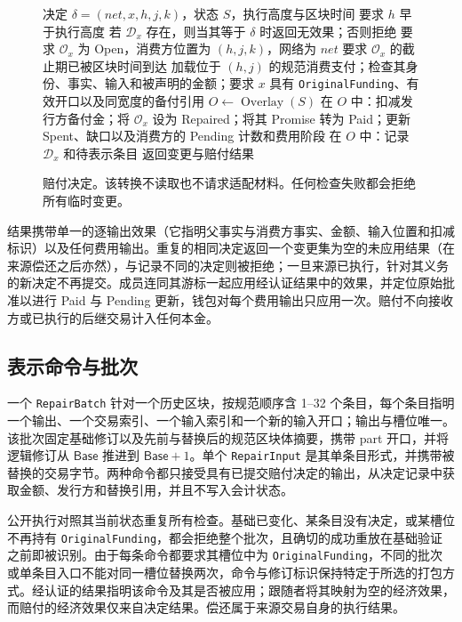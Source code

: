 \begin{figure}[t]
  \small
  \begin{algorithmic}[1]
    \REQUIRE 决定 $\delta=(\mathit{net},x,h,j,k)$，状态 $S$，执行高度与区块时间
    \STATE 要求 $h$ 早于执行高度
    \STATE 若 $\mathcal D_x$ 存在，则当其等于 $\delta$ 时返回无效果；否则拒绝
    \STATE 要求 $\mathcal O_x$ 为 Open，消费方位置为 $(h,j,k)$，网络为 $\mathit{net}$
    \STATE 要求 $\mathcal O_x$ 的截止期已被区块时间到达
    \STATE 加载位于 $(h,j)$ 的规范消费支付；检查其身份、事实、输入和被声明的金额；要求 $x$ 具有 \texttt{OriginalFunding}、有效开口以及同宽度的备付引用
    \STATE $O\gets\operatorname{Overlay}(S)$
    \STATE 在 $O$ 中：扣减发行方备付金；将 $\mathcal O_x$ 设为 Repaired；将其 Promise 转为 Paid；更新 Spent、缺口以及消费方的 Pending 计数和费用阶段
    \STATE 在 $O$ 中：记录 $\mathcal D_x$ 和待表示条目
    \STATE 返回变更与赔付结果
  \end{algorithmic}
  \caption{赔付决定。该转换不读取也不请求适配材料。任何检查失败都会拒绝所有临时变更。}
  \label{fig:protocol-decision}
\end{figure}

结果携带单一的逐输出效果（它指明父事实与消费方事实、金额、输入位置和扣减标识）以及任何费用输出。重复的相同决定返回一个变更集为空的未应用结果（在来源偿还之后亦然），与记录不同的决定则被拒绝；一旦来源已执行，针对其义务的新决定不再提交。成员连同其游标一起应用经认证结果中的效果，并定位原始批准以进行 Paid 与 Pending 更新，钱包对每个费用输出只应用一次。赔付不向接收方或已执行的后继交易计入任何本金。

\subsection{表示命令与批次}
\label{sec:protocol-batch}

一个 \texttt{RepairBatch} 针对一个历史区块，按规范顺序含 1--32 个条目，每个条目指明一个输出、一个交易索引、一个输入索引和一个新的输入开口；输出与槽位唯一。该批次固定基础修订以及先前与替换后的规范区块体摘要，携带 part 开口，并将逻辑修订从 $\mathsf{Base}$ 推进到 $\mathsf{Base}+1$。单个 \texttt{RepairInput} 是其单条目形式，并携带被替换的交易字节。两种命令都只接受具有已提交赔付决定的输出，从决定记录中获取金额、发行方和替换引用，并且不写入会计状态。

公开执行对照其当前状态重复所有检查。基础已变化、某条目没有决定，或某槽位不再持有 \texttt{OriginalFunding}，都会拒绝整个批次，且确切的成功重放在基础验证之前即被识别。由于每条命令都要求其槽位中为 \texttt{OriginalFunding}，不同的批次或单条目入口不能对同一槽位替换两次，命令与修订标识保持特定于所选的打包方式。经认证的结果指明该命令及其是否被应用；跟随者将其映射为空的经济效果，而赔付的经济效果仅来自决定结果。偿还属于来源交易自身的执行结果。

